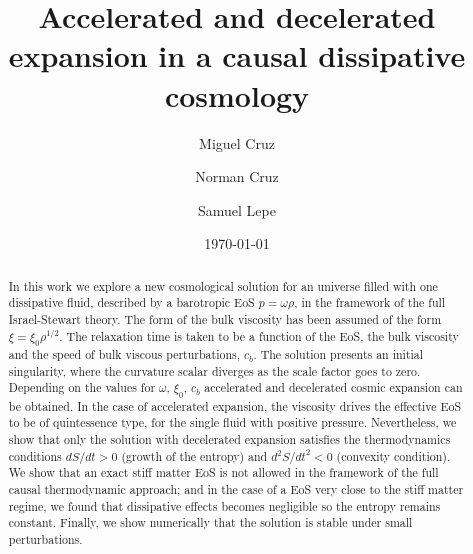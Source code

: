 \documentclass[twocolumn,showpacs,nofootinbib,floats,amsmath,amssymb]{revtex4}
\begin{document}
\title{Accelerated and decelerated expansion in a causal dissipative cosmology}

\author{Miguel Cruz}


\author{Norman Cruz}


\author{Samuel Lepe}




\date{\today}

\begin{abstract}
In this work we explore a new cosmological solution for an universe filled with one dissipative fluid, described by a barotropic EoS $p = \omega \rho$, in the framework of the full Israel-Stewart theory. The form of the bulk viscosity has been assumed of the form $\xi = \xi_{0}\rho^{1/2}$. The relaxation time is taken to be a function of the EoS, the bulk viscosity and the speed of bulk viscous perturbations, $c_{b}$. The solution presents an initial singularity, where the curvature scalar diverges as the scale factor goes to zero. Depending on the values for $\omega$, $\xi_{0}$, $c_{b}$ accelerated and decelerated cosmic expansion can be obtained. In the case of accelerated expansion, the viscosity drives the effective EoS to be of quintessence type, for the single fluid with positive pressure. Nevertheless, we show that only the solution with decelerated expansion satisfies the thermodynamics conditions $dS/dt > 0$ (growth of the entropy) and $d^{2}S/dt^{2} < 0$ (convexity condition). We show that an exact stiff matter EoS is not allowed in the framework of the full causal thermodynamic approach; and in the case of a EoS very close to the stiff matter regime, we found that dissipative effects becomes negligible so the entropy remains constant. Finally, we show numerically that the solution is stable under small perturbations.         
\end{abstract}

\end{document}
